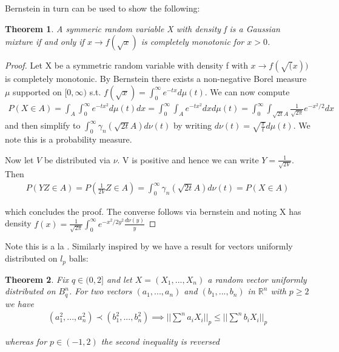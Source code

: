 \documentclass[10pt]{article}
\newcommand{\1}{\textbf{1}}
\newcommand{\R}{\mathbb{R}}
\newtheorem{theorem}{Theorem}
\theoremstyle{remark}
\theoremstyle{definition}
\begin{document}
Bernstein in turn can be used to show the following:

\begin{theorem}
	A symmeric random variable X with density f is a Gaussian mixture if and only if $x \to f(\sqrt{x})$ is completely monotonic for $x > 0$. 
\end{theorem}


\begin{proof}
	Let X be a symmetric random variable with density f with $x \to f(\sqrt(x))$ is completely monotonic. By Bernstein there exists a non-negative Borel measure $\mu$ supported on $[0,\infty)$ s.t. $f(\sqrt{x}) = \int_0^{\infty}e^{-tx}d\mu(t)$. We can now compute
	\begin{align*}
		P(X \in A) = \int_A \int_0^{\infty} e^{-tx^2}d\mu(t)dx = \int_0^{\infty}\int_A e^{-tx^2}dxd\mu(t) = \int_0^{\infty} \int_{\sqrt{2t}A} \frac{1}{\sqrt{2\pi}}e^{-x^2/2}dx
	\end{align*}
	and then simplify to $\int_0^{\infty}\gamma_n(\sqrt{2t}A)d\nu(t)$ by writing $d\nu(t) = \sqrt{\frac{\pi}{t}}d\mu(t)$. We note this is a probability measure.

	Now let $V$ be distributed via $\nu$. V is positive and hence we can write $Y = \frac{1}{\sqrt{2V}}$. Then
	\begin{align*}
		P(YZ \in A) = P(\frac{1}{2V} Z \in A) = \int_0^{\infty}\gamma_n(\sqrt{2t}A)d\nu(t) = P(X \in A)
	\end{align*}

	which concludes the proof. The converse follows via bernstein and noting X has density $f(x) = \frac{1}{\sqrt{2 \pi}} \int_0^{\infty} e^{-x^2/2y^2}\frac{d\nu(y)}{y}$
\end{proof}

Note this is a la \cite{LO}. Similarly inspired by \cite{BGMN} we have a result for vectors uniformly distributed on $l_p$ balls:

\begin{theorem}
	Fix $q \in (0,2]$ and let $X = (X_1,...,X_n)$ a random vector uniformly distributed on $B_q^n$. For two vectors $(a_1,...,a_n)$ and $(b_1,...,b_n)$ in $\R^n$ with $p \geq 2$ we have
	\begin{align*}
		(a_1^2,...,a_n^2) \prec (b_1^2,...,b_n^2) \implies ||\sum^n a_i X_i||_p \leq ||\sum^n b_i X_i||_p
	\end{align*}

	whereas for $p \in (-1,2)$ the second inequality is reversed
\end{theorem}
\end{document}
